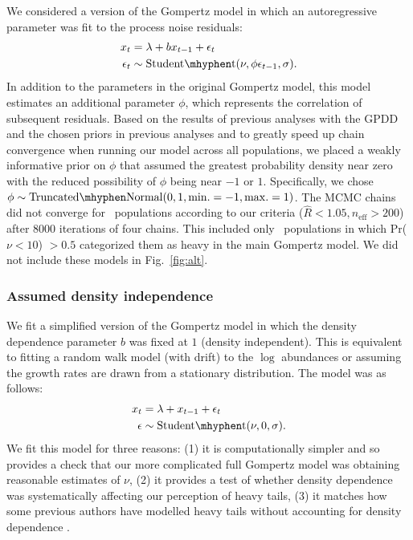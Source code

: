 We considered a version of the Gompertz model in which an autoregressive
parameter was fit to the process noise residuals:
\begin{align*}
x_t &= \lambda + b x_{t-1} + \epsilon_t\\
\epsilon_t &\sim \mathrm{Student\mhyphen t}(\nu, \phi \epsilon_{t-1}, \sigma).
\end{align*}
In addition to the parameters in the original Gompertz model, this model
estimates an additional parameter $\phi$, which represents the correlation of
subsequent residuals. Based on the results of previous analyses with the GPDD
\citep[e.g.][]{connors2014} and the chosen priors in previous analyses
\citep[e.g.][]{thorson2014a} and to greatly speed up chain convergence when
running our model across all populations, we placed a weakly informative prior
on $\phi$ that assumed the greatest probability density near zero with the
reduced possibility of $\phi$ being near $-1$ or $1$. Specifically, we chose
$\phi \sim \mathrm{Truncated\mhyphen Normal}(0, 1, \mathrm{min.} = -1,
\mathrm{max.} = 1)$. The MCMC chains did not converge for
\modelsNoConvergeAROne\ populations according to our criteria ($\widehat{R} <
1.05, n_\mathrm{eff} > 200$) after 8000 iterations of four chains. This
  included only \modelsNoConvergeAROneHeavyBase\ populations in which Pr($\nu
  < 10$) $> 0.5$ categorized them as heavy in the main Gompertz model. We did
  not include these models in Fig.~\ref{fig:alt}.

\subsubsection{Assumed density independence}\label{assumed-density-independence}

We fit a simplified version of the Gompertz model in which the density
dependence parameter $b$ was fixed at $1$ (density independent). This is
equivalent to fitting a random walk model (with drift) to the $\log$
abundances or assuming the growth rates are drawn from a stationary
distribution. The model was as follows:
\begin{align*}
x_t &= \lambda + x_{t-1} + \epsilon_t\\
\epsilon &\sim \mathrm{Student\mhyphen t}(\nu, 0, \sigma).
\end{align*}
We fit this model for three reasons: (1) it is computationally simpler and so
provides a check that our more complicated full Gompertz model was obtaining
reasonable estimates of $\nu$, (2) it provides a test of whether density
dependence was systematically affecting our perception of heavy tails, (3) it
matches how some previous authors have modelled heavy tails without accounting
for density dependence \citep{segura2013}.

